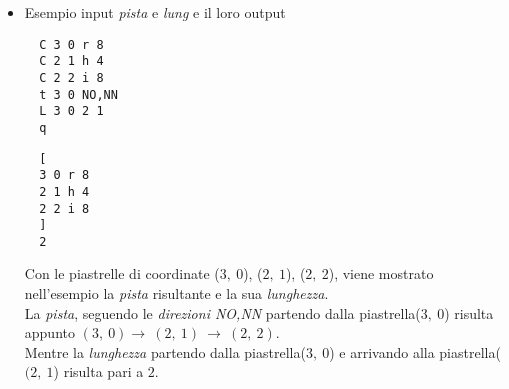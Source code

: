 \documentclass{article}
\begin{document}
\begin{itemize}
\item Esempio input \textit{pista} e \textit{lung} e il loro output\\
  \begin{minipage}[t]{0.45\textwidth}
  \begin{verbatim}
  C 3 0 r 8
  C 2 1 h 4
  C 2 2 i 8
  t 3 0 NO,NN
  L 3 0 2 1
  q
  \end{verbatim}
  \end{minipage}
  \hfill
  \begin{minipage}[t]{0.45\textwidth}
  \begin{verbatim}
  [
  3 0 r 8
  2 1 h 4
  2 2 i 8
  ]
  2
  \end{verbatim}
  \end{minipage}
  Con le piastrelle di coordinate (\(3,\ 0\)), (\(2,\ 1\)), (\(2,\ 2\)), viene mostrato nell'esempio la \textit{pista} risultante e la sua \textit{lunghezza}.\\ 
  La \textit{pista}, seguendo le \textit{direzioni NO,NN} partendo dalla piastrella(\(3,\ 0\)) risulta appunto \((3,\ 0) \rightarrow\ (2,\ 1)\ \rightarrow\ (2,\ 2)\).\\
  Mentre la \textit{lunghezza} partendo dalla piastrella(\(3,\ 0\)) e arrivando alla piastrella(\((2,\ 1\)) risulta pari a \(2\).

\end{itemize}
  
\end{document}
